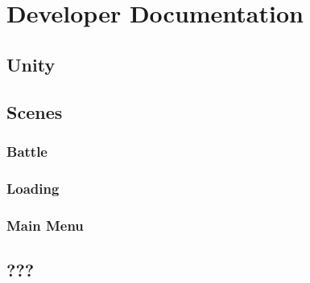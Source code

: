 \chapter{Developer Documentation}

\section{Unity}

\section{Scenes}

\subsection{Battle}

\subsection{Loading}

\subsection{Main Menu}

\section{???}